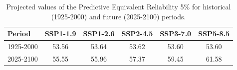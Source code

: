 \begin{table}[htbp]
\centering
\begin{tabular}{lccccc}
\toprule
Period & \textbf{SSP1-1.9} & \textbf{SSP1-2.6} & \textbf{SSP2-4.5} & \textbf{SSP3-7.0} & \textbf{SSP5-8.5} \\
\midrule
1925-2000 & 53.56 & 53.64 & 53.62 & 53.60 & 53.60 \\
2025-2100 & 55.55 & 55.96 & 57.37 & 59.45 & 61.58 \\
\bottomrule
\end{tabular}
\caption{Projected values of the Predictive Equivalent Reliability 5\% for historical (1925-2000) and future (2025-2100) periods.}
\label{tab:pred_scenarios_20per}
\end{table}